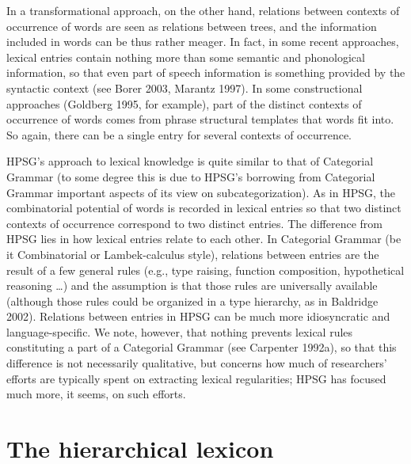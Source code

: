 \documentclass[output=paper]{langsci/langscibook}
\begin{document}
In a transformational approach, on the other hand, relations between contexts of occurrence of words are seen as relations between trees, and the information included in words can be thus rather meager. In fact, in some recent approaches, lexical entries contain nothing more than some semantic and phonological information, so that even part of speech information is something provided by the syntactic context (see Borer 2003, Marantz 1997). In some constructional approaches (Goldberg 1995, for example), part of the distinct contexts of occurrence of words comes from phrase structural templates that words fit into. So again, there can be a single entry for several contexts of occurrence.

HPSG's approach to lexical knowledge is quite similar to that of Categorial Grammar (to some degree this is due to HPSG's borrowing from Categorial Grammar important aspects of its view on subcategorization). As in HPSG, the combinatorial potential of words is recorded in lexical entries so that two distinct contexts of occurrence correspond to two distinct entries. The difference from HPSG lies in how lexical entries relate to each other. In Categorial Grammar (be it Combinatorial or Lambek-calculus style), relations between entries are the result of a few general rules (e.g., type raising, function composition, hypothetical reasoning \ldots) and the assumption is that those rules are universally available (although those rules could be organized in a type hierarchy,  as in Baldridge 2002). Relations between entries in HPSG can be much more idiosyncratic and language-specific. We note, however, that nothing prevents lexical rules constituting a part of a Categorial Grammar (see Carpenter 1992a), so that this difference is not necessarily qualitative, but concerns how much of researchers' efforts are typically spent on extracting lexical regularities; HPSG has focused much more, it seems, on such efforts.


\section{The hierarchical lexicon}
\label{sec:hier-lex}
\end{document}
